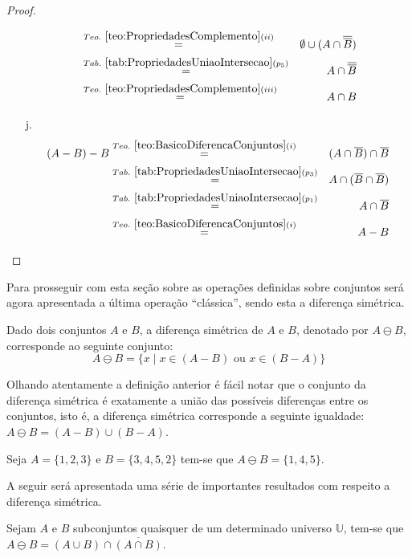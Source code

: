 \begin{proof}
\begin{itemize}
\begin{eqnarray*}
			& \stackrel{Teo. \ \ref{teo:PropriedadesComplemento}(ii)}{=}& \emptyset  \cup (A \cap \overline{\overline{B}})\\
			& \stackrel{Tab. \ \ref{tab:PropriedadesUniaoIntersecao}(p_5)}{=}& A \cap \overline{\overline{B}}\\
			& \stackrel{Teo. \ \ref{teo:PropriedadesComplemento}(iii)}{=}& A \cap B
		\end{eqnarray*}
		\item[j.]
		\begin{eqnarray*}
			(A - B) - B & \stackrel{Teo. \  \ref{teo:BasicoDiferencaConjuntos}(i)}{=} & (A \cap \overline{B}) \cap \overline{B}\\
			& \stackrel{Tab. \ \ref{tab:PropriedadesUniaoIntersecao}(p_3)}{=}& A \cap (\overline{B} \cap \overline{B})\\
			& \stackrel{Tab. \ \ref{tab:PropriedadesUniaoIntersecao}(p_1)}{=}& A \cap \overline{B}\\
			& \stackrel{Teo. \  \ref{teo:BasicoDiferencaConjuntos}(i)}{=} & A - B
		\end{eqnarray*}
	\end{itemize}
\end{proof}

Para prosseguir com esta seção sobre as operações definidas sobre conjuntos será agora apresentada a última operação ``clássica'', sendo esta a diferença simétrica.

\begin{definition}\label{def:DiferencaSimetricaConjuntos}
	Dado dois conjuntos $A$ e $B$, a diferença simétrica de $A$ e $B$, denotado por $A \ominus B$, corresponde ao seguinte conjunto:
	$$A \ominus B = \{x \mid x \in (A - B) \mbox{ ou } x \in (B - A)\}$$
\end{definition}

Olhando atentamente a definição anterior é fácil notar que o conjunto da diferença simétrica é exatamente a união das possíveis diferenças entre os conjuntos, isto é, a diferença simétrica corresponde a seguinte igualdade: $A \ominus B = (A - B) \cup (B - A)$.

\begin{exem}
	Seja $A = \{1, 2, 3\}$ e $B = \{3, 4, 5, 2\}$ tem-se que $A \ominus B = \{1, 4, 5\}$.
\end{exem}

A seguir será apresentada uma série de importantes resultados com respeito a diferença simétrica.

\begin{theorem}\label{teo:PropriedadeBasicaDifSimetrica}
	Sejam $A$ e $B$ subconjuntos quaisquer de um determinado universo $\mathbb{U}$, tem-se que $A \ominus B = (A \cup B) \cap \overline{(A \cap B)}$.
\end{theorem}

